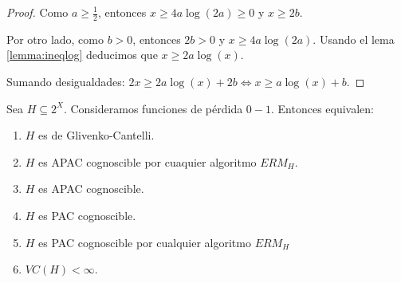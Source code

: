 \begin{proof}
 Como $a \ge \frac{1}{2}$, entonces $x \ge 4a \log(2a) \ge 0$ y $x \ge 2b$.
 
 Por otro lado, como $b > 0$, entonces $2b > 0$ y $x \ge 4a \log(2a)$. Usando el lema \ref{lemma:ineqlog} 
 deducimos que $x \ge 2a \log(x)$.
 
 Sumando desigualdades: $2x \ge 2a \log(x) + 2b \Leftrightarrow x \ge a\log(x) + b$.
\end{proof}


\begin{theorem}
Sea $H\subseteq 2^X$. Consideramos funciones de pérdida $0-1$. Entonces equivalen:
\begin{enumerate}[i]
\item \label{th:fundi} $H$ es de Glivenko-Cantelli.
\item \label{th:fundii} $H$ es APAC cognoscible por cuaquier algoritmo $ERM_H$.
\item \label{th:fundiii} $H$ es APAC cognoscible.
\item \label{th:fundiv} $H$ es PAC cognoscible.
\item \label{th:fundv} $H$ es PAC cognoscible por cualquier algoritmo $ERM_H$
\item \label{th:fundvi} $VC (H) < \infty$.
\end{enumerate}
\label{th:fundamental}
\end{theorem}

